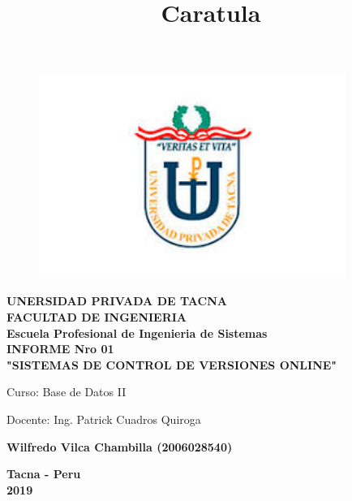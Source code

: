 \documentclass[12pt,spanish]{article}
\begin{document}
\title{Caratula}


\begin{titlepage}

\begin{figure}[htb]
\begin{center}
\includegraphics[width=10cm]{./Imagenes/logo}
\end{center}
\end{figure}

\begin{center}
\vspace*{-0.5in}
\LARGE{\textbf{\bf UNERSIDAD PRIVADA DE TACNA}}\\

\vspace*{0.25in}
\large{\textbf{\bf FACULTAD DE INGENIERIA}}\\

\vspace*{0.15in}
\large{\textbf{\bf Escuela Profesional de Ingenieria de Sistemas}}\\


\vspace*{0.5in}
\Large{\textbf{\bf INFORME Nro 01}}\\
\Large{\textbf{\bf "SISTEMAS DE CONTROL DE VERSIONES ONLINE"}}\\

\vspace*{0.6in}
\begin{Large}
Curso: Base de Datos II \\
\end{Large}

\vspace*{0.3in}
\begin{Large}
Docente: Ing. Patrick Cuadros Quiroga \\
\end{Large}

\vspace*{0.5in}
\begin{large}
\textbf{\bf Wilfredo Vilca Chambilla (2006028540)}\\
\end{large}

\vspace*{1.5in}
\begin{large}
\textbf{\bf Tacna - Peru}\\
\textbf{\bf 2019}\\
\end{large}

\end{center}

\end{titlepage}
\end{document}
